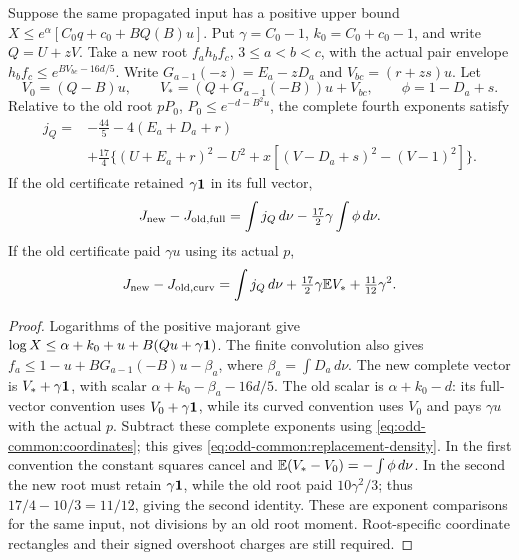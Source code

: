 \begin{lemma}
\label{lem:odd-common:replacement}
Suppose the same propagated input has a positive upper bound
\(X\le e^\alpha[C_0q+c_0+BQ(B)u]\).
Put \(\gamma=C_0-1\), \(k_0=C_0+c_0-1\), and write
\(Q=U+zV\). Take a new root \(f_a h_bf_c\), \(3\le a<b<c\),
with the actual pair envelope
\(h_bf_c\le e^{BV_{bc}-16d/5}\).
Write \(G_{a-1}(-z)=E_a-zD_a\) and
\(V_{bc}=(r+zs)u\). Let
\[
 V_0=(Q-B)u,\qquad V_*=(Q+G_{a-1}(-B))u+V_{bc},
 \qquad\phi=1-D_a+s.
\]
Relative to the old root \(pP_0\),
\(P_0\le e^{-d-B^2u}\), the complete fourth exponents satisfy
\begin{equation}\label{eq:odd-common:replacement-density}
\begin{aligned}
 j_Q={}&-\tfrac{44}{5}-4(E_a+D_a+r)\\
 &+\tfrac{17}{4}\{(U+E_a+r)^2-U^2
            +x[(V-D_a+s)^2-(V-1)^2]\}.
\end{aligned}
\end{equation}
If the old certificate retained \(\gamma\mathbf1\) in its full vector,
\begin{equation}\label{eq:odd-common:replacement-full}
 J_{\rm new}-J_{\rm old,full}
   =\int j_Q\,d\nu-\tfrac{17}{2}\gamma\int\phi\,d\nu.
\end{equation}
If the old certificate paid \(\gamma u\) using its actual \(p\),
\begin{equation}\label{eq:odd-common:replacement-curved}
 J_{\rm new}-J_{\rm old,curv}
   =\int j_Q\,d\nu+\tfrac{17}{2}\gamma\mathbb E V_*
                                    +\tfrac{11}{12}\gamma^2.
\end{equation}
\end{lemma}
\begin{proof}
Logarithms of the positive majorant give
\(\log X\le\alpha+k_0+u+B(Qu+\gamma\mathbf1)\).
The finite convolution also gives
\(f_a\le1-u+BG_{a-1}(-B)u-\beta_a\),
where \(\beta_a=\int D_a\,d\nu\).
The new complete vector is \(V_*+\gamma\mathbf1\), with scalar
\(\alpha+k_0-\beta_a-16d/5\).
The old scalar is \(\alpha+k_0-d\): its full-vector convention uses
\(V_0+\gamma\mathbf1\), while its curved convention uses \(V_0\)
and pays \(\gamma u\) with the actual \(p\).
Subtract these complete exponents using
\eqref{eq:odd-common:coordinates}; this gives
\eqref{eq:odd-common:replacement-density}.
In the first convention the constant squares cancel and
\(\mathbb E(V_*-V_0)=-\int\phi\,d\nu\).
In the second the new root must retain \(\gamma\mathbf1\), while the
old root paid \(10\gamma^2/3\); thus
\(17/4-10/3=11/12\), giving the second identity.
These are exponent comparisons for the same input, not divisions
by an old root moment. Root-specific coordinate rectangles and
their signed overshoot charges are still required.
\end{proof}

